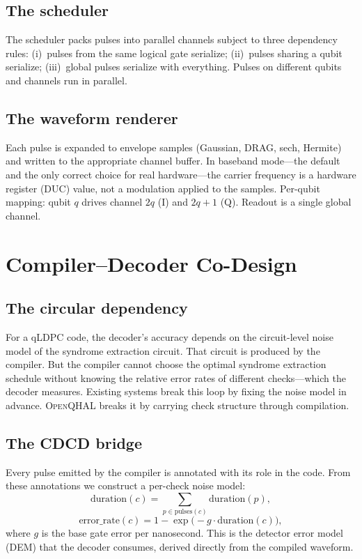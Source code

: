 \documentclass[aps,prApplied,twocolumn,superscriptaddress,floatfix]{revtex4-2}
\begin{document}
\subsection{The scheduler}

The scheduler packs pulses into parallel channels subject to three
dependency rules: (i)~pulses from the same logical gate serialize;
(ii)~pulses sharing a qubit serialize; (iii)~global pulses serialize
with everything. Pulses on different qubits and channels run in
parallel.

\subsection{The waveform renderer}

Each pulse is expanded to envelope samples (Gaussian, DRAG, sech,
Hermite) and written to the appropriate channel buffer. In baseband
mode---the default and the only correct choice for real hardware---the
carrier frequency is a hardware register (DUC) value, not a modulation
applied to the samples. Per-qubit mapping: qubit $q$ drives channel
$2q$ (I) and $2q+1$ (Q). Readout is a single global channel.

\section{Compiler--Decoder Co-Design}
\label{sec:cdcd}

\subsection{The circular dependency}

For a qLDPC code, the decoder's accuracy depends on the circuit-level
noise model of the syndrome extraction circuit. That circuit is
produced by the compiler. But the compiler cannot choose the optimal
syndrome extraction schedule without knowing the relative error rates
of different checks---which the decoder measures. Existing systems
break this loop by fixing the noise model in advance.
\textsc{OpenQHAL} breaks it by carrying check structure through
compilation.

\subsection{The CDCD bridge}

Every pulse emitted by the compiler is annotated with its role in the
code. From these annotations we construct a per-check noise model:
\begin{equation}
\text{duration}(c) = \sum_{p \in \text{pulses}(c)} \text{duration}(p),
\end{equation}
\begin{equation}
\text{error\_rate}(c) = 1 - \exp\!\bigl(-g \cdot \text{duration}(c)\bigr),
\end{equation}
where $g$ is the base gate error per nanosecond. This is the detector
error model (DEM) that the decoder consumes, derived directly from the
compiled waveform.
\end{document}
